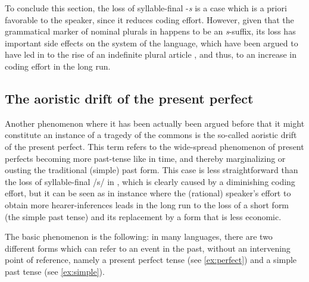 \documentclass[output=paper,hidelinks]{langscibook}
\begin{document}
\begin{exe}
  \ex
  \begin{xlist}
  \end{xlist}
\end{exe}

To conclude this section, the loss of syllable-final -\emph{s} is a case which is a priori favorable to the speaker, since it reduces coding effort. However, given that the grammatical marker of nominal plurals in  happens to be an \emph{s}-suffix, its loss has important side effects on the system of the language, which have been argued to have led in  to the rise of an indefinite plural article \citep[see, e.g.,][]{woledge56,carlier01,carlier13}, and thus, to an increase in coding effort in the long run.\largerpage[2]

\subsection{The aoristic drift of the present perfect}
\label{sec:aorist-drift-pres}

Another phenomenon where it has been actually been argued before \citep[see][]{schaden12a,schaden13} that it might constitute an instance of a tragedy of the commons is the so-called aoristic drift of the present perfect. This term refers to the wide-spread phenomenon of present perfects becoming more past-tense like in time, and thereby marginalizing or ousting the traditional (simple) past form. This case is less straightforward than the loss of syllable-final /s/ in , which is clearly caused by a diminishing coding effort, but it can be seen as in instance where the (rational) speaker's effort to obtain more hearer-inferences leads in the long run to the loss of a short form (the simple past tense) and its replacement by a form that is less economic.

The basic phenomenon is the following: in many languages, there are two different forms which can refer to an event in the past, without an intervening point of reference, namely a present perfect tense (see \ref{ex:perfect}) and a simple past tense (see \ref{ex:simple}).
\end{document}
